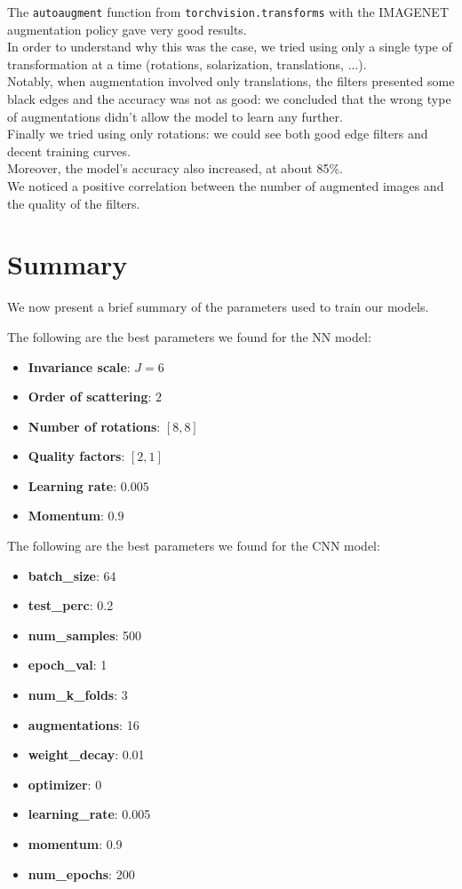 \documentclass{report}
\begin{document}
The \texttt{autoaugment} function from \texttt{torchvision.transforms} with the IMAGENET augmentation policy gave very good results.\\
In order to understand why this was the case, we tried using only a single type of transformation at a time (rotations, solarization, translations, ...).\\
Notably, when augmentation involved only translations, the filters presented some black edges and the accuracy was not as good: we concluded that the wrong type of augmentations didn't allow the model to learn any further.\\

Finally we tried using only rotations: we could see both good edge filters and decent training curves.\\
Moreover, the model's accuracy also increased, at about 85\%.\\
We noticed a positive correlation between the number of augmented images and the quality of the filters.\\



\section{Summary}
We now present a brief summary of the parameters used to train our models.

The following are the best parameters we found for the NN model:
\begin{itemize}
  \item \textbf{Invariance scale}: $J=6$
  \item \textbf{Order of scattering}: $2$
  \item \textbf{Number of rotations}: $[8, 8]$
  \item \textbf{Quality factors}: $[2, 1]$
  \item \textbf{Learning rate}: $0.005$ 
  \item \textbf{Momentum}: $0.9$
\end{itemize}

The following are the best parameters we found for the CNN model:
\begin{itemize}
  \item \textbf{batch\_size}: 64
  \item \textbf{test\_perc}: 0.2
  \item \textbf{num\_samples}: 500
  \item \textbf{epoch\_val}: 1
  \item \textbf{num\_k\_folds}: 3
  \item \textbf{augmentations}: 16 
  \item \textbf{weight\_decay}: 0.01
  \item \textbf{optimizer}: 0 
  \item \textbf{learning\_rate}: 0.005 
  \item \textbf{momentum}: 0.9 
  \item \textbf{num\_epochs}: 200
\end{itemize}
\pagebreak
\end{document}
